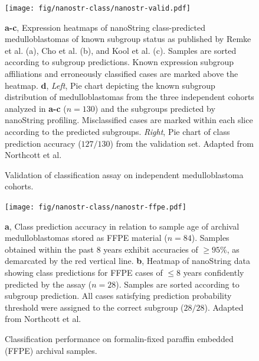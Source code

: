 \documentclass[11pt,letterpaper]{article}
\theoremstyle{definition}
\begin{document}
\begin{figure}[h]
	\begin{center}
		\texttt{[image: fig/nanostr-class/nanostr-valid.pdf]}
	\end{center}
	\caption{Validation of classification assay on independent medulloblastoma cohorts.}
	\textbf{a-c}, Expression heatmaps of nanoString class-predicted medulloblastomas of known subgroup status as published by Remke et al. (a), Cho et al. (b), and Kool et al. (c). Samples are sorted according to subgroup predictions. Known expression subgroup affiliations and erroneously classified cases are marked above the heatmap. \textbf{d}, \emph{Left}, Pie chart depicting the known subgroup distribution of medulloblastomas from the three independent cohorts analyzed in \textbf{a-c} ($n = 130$) and the subgroups predicted by nanoString profiling. Misclassified cases are marked within each slice according to the predicted subgroups. \emph{Right}, Pie chart of class prediction accuracy ($127/130$) from the validation set. Adapted from Northcott et al.
	\label{fig:nanostr-valid}
\end{figure}

\begin{figure}[h]
	\begin{center}
		\texttt{[image: fig/nanostr-class/nanostr-ffpe.pdf]}
	\end{center}
	\caption{Classification performance on formalin-fixed paraffin embedded (FFPE) archival samples.}
	\textbf{a}, Class prediction accuracy in relation to sample age of archival medulloblastomas stored as FFPE material ($n = 84$). Samples obtained within the past 8 years exhibit accuracies of $\geq 95\%$, as demarcated by the red vertical line. \textbf{b}, Heatmap of nanoString data showing class predictions for FFPE cases of $\leq 8$ years confidently predicted by the assay ($n = 28$). Samples are sorted according to subgroup prediction. All cases satisfying prediction probability threshold were assigned to the correct subgroup ($28/28$). Adapted from Northcott et al.
	\label{fig:nanostr-ffpe}
\end{figure}

\clearpage
\end{document}
